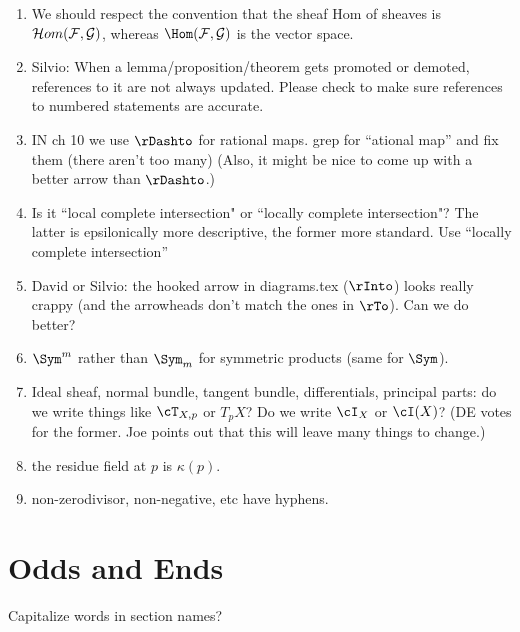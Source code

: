 \documentclass[12pt, leqno]{book}
\begin{document}
\begin{enumerate}
\item We should respect the convention that the sheaf Hom of sheaves is
$\cH om(\cF,\cG)$, whereas $\Hom(\cF,\cG)$ is the vector space.

\item Silvio: When a lemma/proposition/theorem gets promoted or demoted, references to it are not always updated. Please check to make sure references to numbered statements are accurate. 


\item IN ch 10 we use $\rDashto$ for rational maps. grep for ``ational map'' and fix them (there aren't too many) (Also, it might be nice to come up with a better arrow than $\rDashto$.)

\item Is it ``local complete intersection" or ``locally complete intersection"? The latter is epsilonically more descriptive, the former more standard. Use ``locally complete intersection''

\item David or Silvio: the hooked arrow in diagrams.tex ($\rInto$) looks really crappy (and the arrowheads don't match the ones in $\rTo$). Can we do better?


\item $\Sym^{m}$ rather than $\Sym_{m}$ for symmetric products (same for $\Sym$).
\item Ideal sheaf, normal bundle, tangent bundle, differentials, principal parts: do we write things like 
$\cT_{X,p}$ or $T_{p}X$? Do we write $\cI_{X}$ or $\cI(X)$? (DE votes for the former. Joe points out that
this will leave many things to change.)

\item the residue field at $p$ is $\kappa(p)$.

\item non-zerodivisor, non-negative, etc have hyphens.

\end{enumerate}

\section{Odds and Ends}

Capitalize words in section names?
\end{document}
